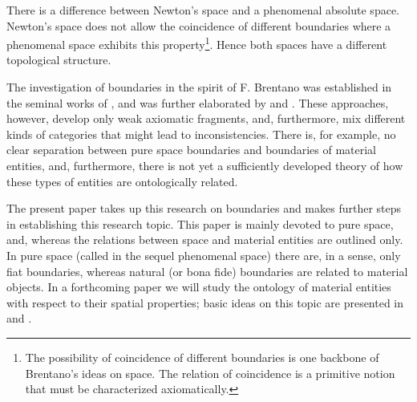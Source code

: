 \documentclass{ao2e}
\begin{document}
There is a difference between Newton's space and a phenomenal absolute space. Newton's space does not allow the coincidence of different boundaries where a phenomenal space exhibits this property\footnote{The possibility of coincidence of different boundaries is one backbone of Brentano's ideas on space. The relation of coincidence is a primitive notion that must be characterized axiomatically.}. Hence both spaces have a different topological structure.

The investigation of boundaries in the spirit of F. Brentano was established in the seminal works of \cite{chisholm-rm-1984-a}, and was further elaborated by \cite{smith-b-1996-a} and \cite{varzi-ac-1996-a}. 
These approaches, however, develop only weak axiomatic fragments, and, furthermore, mix different kinds of categories that might lead to inconsistencies. There is, for example, no clear separation between pure space boundaries and boundaries of material entities, and, furthermore,  there is not yet a sufficiently developed theory of how these types of entities are ontologically related.

The present paper takes up this research on boundaries and makes further steps in establishing this research topic. This paper is mainly devoted to pure space, and, whereas the relations between space and material entities are outlined only. 
In pure space (called in the sequel phenomenal space) there are, in a sense, only fiat boundaries, whereas natural (or bona fide) boundaries are related to material objects. In a forthcoming paper we will study the ontology of
material entities with respect to their spatial properties; basic ideas on this topic are presented in 
\cite{baumann-r-2009-a} and \cite{herre-h-2010-a}.
\end{document}
